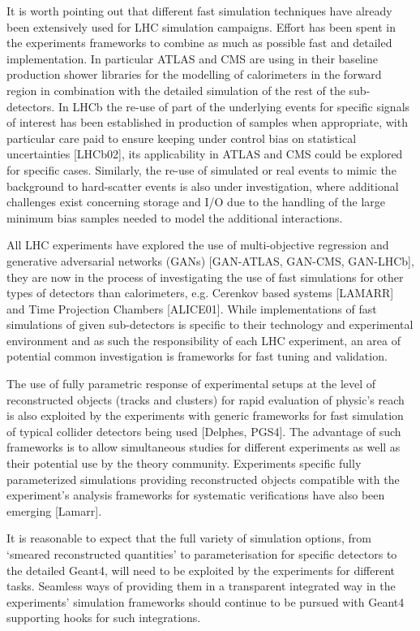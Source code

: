 \documentclass[10pt,a4paper]{article}
\begin{document}
It is worth pointing out that different fast simulation techniques have
already been extensively used for LHC simulation campaigns. Effort has
been spent in the experiments frameworks to combine as much as possible
fast and detailed implementation. In particular ATLAS and CMS are using
in their baseline production shower libraries for the modelling of
calorimeters in the forward region in combination with the detailed
simulation of the rest of the sub-detectors. In LHCb the re-use of part
of the underlying events for specific signals of interest has been
established in production of samples when appropriate, with particular
care paid to ensure keeping under control bias on statistical
uncertainties {[}LHCb02{]}, its applicability in ATLAS and CMS could be
explored for specific cases. Similarly, the re-use of simulated or real
events to mimic the background to hard-scatter events is also under
investigation, where additional challenges exist concerning storage and
I/O due to the handling of the large minimum bias samples needed to
model the additional interactions.

All LHC experiments have explored the use of multi-objective regression
and generative adversarial networks (GANs) {[}GAN-ATLAS, GAN-CMS,
GAN-LHCb{]}, they are now in the process of investigating the use of
fast simulations for other types of detectors than calorimeters, e.g.
Cerenkov based systems {[}LAMARR{]} and Time Projection Chambers
{[}ALICE01{]}. While implementations of fast simulations of given
sub-detectors is specific to their technology and experimental
environment and as such the responsibility of each LHC experiment, an
area of potential common investigation is frameworks for fast tuning and
validation.

The use of fully parametric response of experimental setups at the level
of reconstructed objects (tracks and clusters) for rapid evaluation of
physic's reach is also exploited by the experiments with generic
frameworks for fast simulation of typical collider detectors being used
{[}Delphes, PGS4{]}. The advantage of such frameworks is to allow
simultaneous studies for different experiments as well as their
potential use by the theory community. Experiments specific fully
parameterized simulations providing reconstructed objects compatible
with the experiment's analysis frameworks for systematic verifications
have also been emerging {[}Lamarr{]}.

It is reasonable to expect that the full variety of simulation options,
from `smeared reconstructed quantities' to parameterisation for specific
detectors to the detailed Geant4, will need to be exploited by the
experiments for different tasks. Seamless ways of providing them in a
transparent integrated way in the experiments' simulation frameworks
should continue to be pursued with Geant4 supporting hooks for such
integrations.
\end{document}
